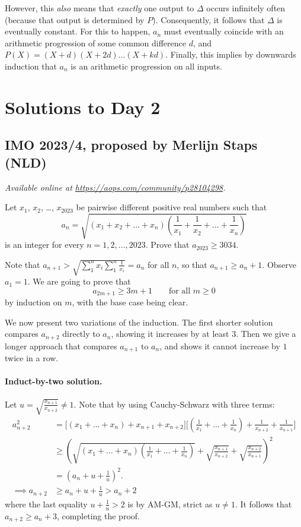 \documentclass[11pt]{scrartcl}
\begin{document}
However, this \emph{also} means that \emph{exactly} one output to $\Delta$
occurs infinitely often (because that output is determined by $P$).
Consequently, it follows that $\Delta$ is eventually constant.
For this to happen, $a_n$ must eventually coincide with an arithmetic
progression of some common difference $d$,
and $P(X) = (X+d)(X+2d) \dots (X+kd)$.
Finally, this implies by downwards induction that $a_n$ is
an arithmetic progression on all inputs.
\pagebreak

\section{Solutions to Day 2}
\subsection{IMO 2023/4, proposed by Merlijn Staps (NLD)}
\textsl{Available online at \url{https://aops.com/community/p28104298}.}
\begin{mdframed}[style=mdpurplebox,frametitle={Problem statement}]
Let $x_1$, $x_2$, \dots, $x_{2023}$ be pairwise different positive real numbers such that
\[ a_n = \sqrt{(x_1+x_2+\dots+x_n)
  \left(\frac{1}{x_1}+\frac{1}{x_2}+\dots+\frac{1}{x_n}\right)} \]
is an integer for every $n=1,2,\dots,2023$. Prove that $a_{2023} \geq 3034$.
\end{mdframed}
Note that $a_{n+1} > \sqrt{\sum_1^n x_i \sum_1^n \frac{1}{x_i}} = a_n$ for all $n$,
so that $a_{n+1} \geq a_n + 1$.
Observe $a_1 = 1$.
We are going to prove that \[ a_{2m+1} \geq 3m+1 \qquad \text{for all } m \geq 0 \]
by induction on $m$, with the base case being clear.

We now present two variations of the induction.
The first shorter solution compares $a_{n+2}$ directly to $a_n$,
showing it increases by at least $3$.
Then we give a longer approach that compares $a_{n+1}$ to $a_n$,
and shows it cannot increase by $1$ twice in a row.

\paragraph{Induct-by-two solution.}
Let $u = \sqrt{\frac{x_{n+1}}{x_{n+2}}} \neq 1$.
Note that by using Cauchy-Schwarz with three terms:
\begin{align*}
  a_{n+2}^2 &= \Bigg[ (x_1+\dots+x_n)+x_{n+1}+x_{n+2} \Bigg]
    \Bigg[ \left(\frac{1}{x_1}+\dots+\frac{1}{x_n}\right)
    +\frac{1}{x_{n+2}} + \frac{1}{x_{n+1}} \Bigg] \\
  &\geq \left( \sqrt{ (x_1+\dots+x_n)\left(\frac{1}{x_1}+\dots+\frac{1}{x_n}\right)}
    + \sqrt{\frac{x_{n+1}}{x_{n+2}}} + \sqrt{\frac{x_{n+2}}{x_{n+1}}} \right)^2 \\
  &= \left( a_n + u + \frac 1u \right)^2. \\
  \implies a_{n+2} &\ge a_n + u + \frac 1u > a_n + 2
\end{align*}
where the last equality $u + \frac 1u > 2$ is by AM-GM, strict as $u \neq 1$.
It follows that $a_{n+2} \geq a_n + 3$, completing the proof.
\end{document}
